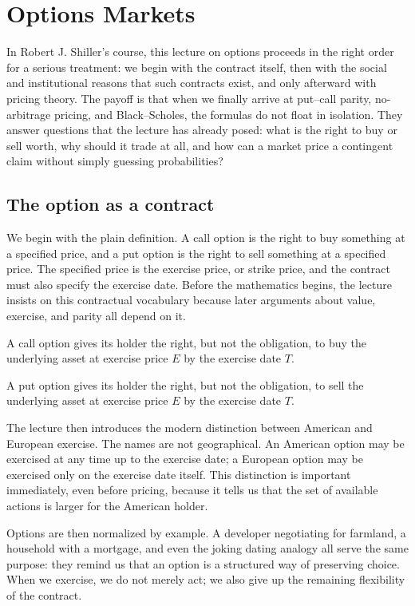 \chapter{Options Markets}

In Robert J. Shiller's course, this lecture on options proceeds in the right order for a serious treatment: we begin with the contract itself, then with the social and institutional reasons that such contracts exist, and only afterward with pricing theory. The payoff is that when we finally arrive at put--call parity, no-arbitrage pricing, and Black--Scholes, the formulas do not float in isolation. They answer questions that the lecture has already posed: what is the right to buy or sell worth, why should it trade at all, and how can a market price a contingent claim without simply guessing probabilities?

\section{The option as a contract}

We begin with the plain definition. A call option is the right to buy something at a specified price, and a put option is the right to sell something at a specified price. The specified price is the exercise price, or strike price, and the contract must also specify the exercise date. Before the mathematics begins, the lecture insists on this contractual vocabulary because later arguments about value, exercise, and parity all depend on it.

\begin{definition}
A call option gives its holder the right, but not the obligation, to buy the underlying asset at exercise price $E$ by the exercise date $T$.

A put option gives its holder the right, but not the obligation, to sell the underlying asset at exercise price $E$ by the exercise date $T$.
\end{definition}

The lecture then introduces the modern distinction between American and European exercise. The names are not geographical. An American option may be exercised at any time up to the exercise date; a European option may be exercised only on the exercise date itself. This distinction is important immediately, even before pricing, because it tells us that the set of available actions is larger for the American holder.

Options are then normalized by example. A developer negotiating for farmland, a household with a mortgage, and even the joking dating analogy all serve the same purpose: they remind us that an option is a structured way of preserving choice. When we exercise, we do not merely act; we also give up the remaining flexibility of the contract.

